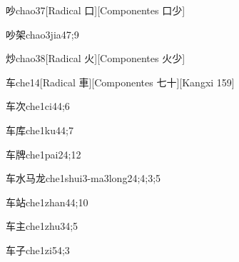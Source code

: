 \begin{verbete}{吵}{chao3}{7}[Radical ⼝][Componentes ⼝少]
\end{verbete}

\begin{verbete}{吵架}{chao3jia4}{7;9}
\end{verbete}

\begin{verbete}{炒}{chao3}{8}[Radical ⽕][Componentes ⽕少]
\end{verbete}

\begin{verbete}{车}{che1}{4}[Radical 車][Componentes 七十][Kangxi 159]
\end{verbete}

\begin{verbete}{车次}{che1ci4}{4;6}
\end{verbete}

\begin{verbete}{车库}{che1ku4}{4;7}
\end{verbete}

\begin{verbete}{车牌}{che1pai2}{4;12}
\end{verbete}

\begin{verbete}{车水马龙}{che1shui3-ma3long2}{4;4;3;5}
\end{verbete}

\begin{verbete}{车站}{che1zhan4}{4;10}
\end{verbete}

\begin{verbete}{车主}{che1zhu3}{4;5}
\end{verbete}

\begin{verbete}{车子}{che1zi5}{4;3}
\end{verbete}

